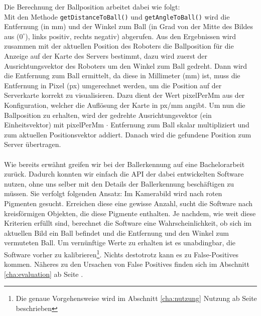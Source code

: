 Die Berechnung der Ballposition arbeitet dabei wie folgt:\\
 Mit den Methode \lstinline|getDistanceToBall()| und
    \lstinline|getAngleToBall()| wird die Entfernung (in mm) und der Winkel
    zum Ball (in Grad von der Mitte des Bildes aus ($0^\circ$), links positiv, rechts
		negativ) abgerufen. 
Aus den Ergebnissen wird zusammen mit der aktuellen Position des Roboters
    die Ballposition für die Anzeige auf der Karte des Servers bestimmt, dazu wird zuerst der Ausrichtungsvektor des
		Roboters um den Winkel zum Ball gedreht.
Dann wird die Entfernung zum Ball ermittelt, da diese in Millimeter (mm) ist, muss
die Entfernung in Pixel (px)  umgerechnet werden, um die Position auf der
Serverkarte korrekt zu visualisieren. Dazu dient der Wert
pixelPerMm aus der Konfiguration, welcher die Auflösung der Karte in px/mm angibt. Um nun die Ballposition zu
	erhalten, wird der gedrehte Ausrichtungsvektor (ein Einheitsvektor) mit
		pixelPerMm $\cdot$ Entfernung zum Ball skalar multipliziert und zum aktuellen
		Positionsvektor addiert.
Danach wird die gefundene Position zum Server übertragen.
\\\\
Wie bereits erwähnt greifen wir bei der Ballerkennung auf eine Bachelorarbeit 
zurück. Dadurch konnten wir einfach
die API der dabei entwickelten Software nutzen, ohne uns selber mit
den Details der Ballerkennung beschäftigen zu müssen. Sie verfolgt
folgenden Ansatz: Im Kamerabild wird nach roten Pigmenten
gesucht. Erreichen diese eine gewisse Anzahl, sucht die Software nach
kreisförmigen Objekten, die diese Pigmente enthalten. Je nachdem,
wie weit diese Kriterien erfüllt sind, berechnet die Software eine
Wahrscheinlichkeit, ob sich im aktuellen Bild ein Ball befindet und
die Entfernung und den Winkel zum vermuteten Ball. Um vernünftige
Werte zu erhalten ist es unabdingbar, die Software vorher zu
kalibrieren\footnote{Die genaue Vorgehensweise wird im Abschnitt
\ref{cha:nutzung} Nutzung ab Seite \pageref{cha:nutzung} beschrieben}.  Nichts
destotrotz kann es zu False-Positives
kommen. Näheres zu den  Ursachen von
False Positives finden sich im Abschnitt \ref{cha:evaluation} ab Seite \pageref{cha:evaluation}.
